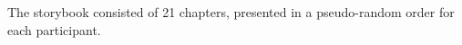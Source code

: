 \documentclass[10pt,letterpaper]{article}
\newcommand\Tstrut{\rule{0pt}{2.6ex}}       %
\newcommand\Bstrut{\rule[-1ex]{0pt}{0pt}} %
\newcommand{\TBstrut}{\Tstrut\Bstrut} %
\begin{document}

The storybook consisted of 21 chapters, presented in a pseudo-random order for each participant. 
\end{document}
